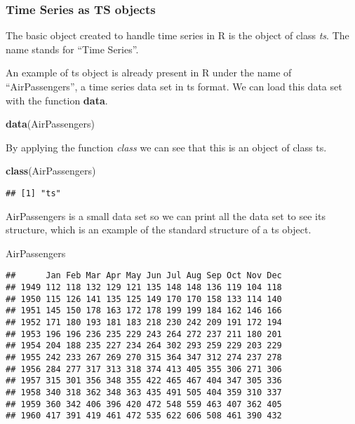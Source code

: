 \documentclass[
]{article}
\newenvironment{Shaded}{\begin{snugshade}}{\end{snugshade}}
\newcommand{\FunctionTok}[1]{\textcolor[rgb]{0.13,0.29,0.53}{\textbf{#1}}}
\newcommand{\NormalTok}[1]{#1}
\begin{document}
\subsubsection{Time Series as TS objects}\label{time-series-as-ts-objects}

The basic object created to handle time series in R is the object of class \emph{ts}. The name stands for ``Time Series''.

An example of ts object is already present in R under the name of ``AirPassengers'', a time series data set in ts format. We can load this data set with the function \textbf{data}.

\begin{Shaded}
\begin{Highlighting}[]
\FunctionTok{data}\NormalTok{(AirPassengers)}
\end{Highlighting}
\end{Shaded}

By applying the function \emph{class} we can see that this is an object of class ts.

\begin{Shaded}
\begin{Highlighting}[]
\FunctionTok{class}\NormalTok{(AirPassengers)}
\end{Highlighting}
\end{Shaded}

\begin{verbatim}
## [1] "ts"
\end{verbatim}

AirPassengers is a small data set so we can print all the data set to see its structure, which is an example of the standard structure of a ts object.

\begin{Shaded}
\begin{Highlighting}[]
\NormalTok{AirPassengers}
\end{Highlighting}
\end{Shaded}

\begin{verbatim}
##      Jan Feb Mar Apr May Jun Jul Aug Sep Oct Nov Dec
## 1949 112 118 132 129 121 135 148 148 136 119 104 118
## 1950 115 126 141 135 125 149 170 170 158 133 114 140
## 1951 145 150 178 163 172 178 199 199 184 162 146 166
## 1952 171 180 193 181 183 218 230 242 209 191 172 194
## 1953 196 196 236 235 229 243 264 272 237 211 180 201
## 1954 204 188 235 227 234 264 302 293 259 229 203 229
## 1955 242 233 267 269 270 315 364 347 312 274 237 278
## 1956 284 277 317 313 318 374 413 405 355 306 271 306
## 1957 315 301 356 348 355 422 465 467 404 347 305 336
## 1958 340 318 362 348 363 435 491 505 404 359 310 337
## 1959 360 342 406 396 420 472 548 559 463 407 362 405
## 1960 417 391 419 461 472 535 622 606 508 461 390 432
\end{verbatim}
\end{document}
